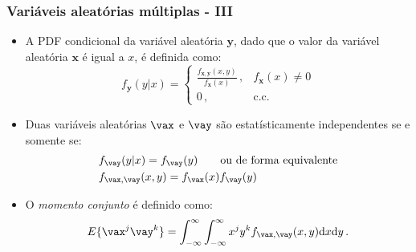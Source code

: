\begin{frame}
    \frametitle{Variáveis aleatórias múltiplas - III}

    \begin{itemize}
     \item A PDF condicional da variável aleatória $\mathbf{y}$, dado que o valor da variável aleatória $\mathbf{x}$ é igual a $x$, é definida como:
      \begin{equation}
      f_{\mathbf{y}}(y|x) =  \begin{cases}
				    \frac{f_{\mathbf{x},\mathbf{y}}(x,y)}{f_{\mathbf{x}}(x)} \, , & f_{\mathbf{x}}(x) \neq 0 \\
				    0 \, , & \mathrm{c.c.}
                               \end{cases}
      \end{equation}
      \item Duas variáveis aleatórias $\vax$ e $\vay$ são estatísticamente independentes se e somente se:
      \begin{align}
	  & f_{\vay}(y|x) = f_{\vay}(y) \qquad \textrm{ou de forma equivalente} \\
	  & f_{\vax,\vay}(x,y) = f_{\vax}(x)f_{\vay}(y)
      \end{align}
      \item O \textit{momento conjunto} é definido como:
      \begin{equation}
	  E\{\vax^j\vay^k\} = \int_{-\infty}^{\infty}\int_{-\infty}^{\infty} x^j y^k f_{\vax,\vay}(x,y)\mathrm{d}x\mathrm{d}y \, .
      \end{equation}
      
    \end{itemize}

\end{frame}

